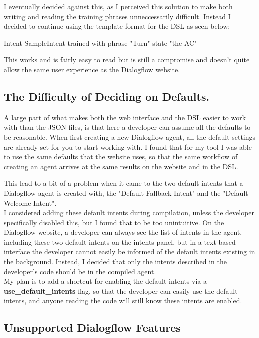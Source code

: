 I eventually decided against this, as I perceived this solution to make both writing and reading the training phrases unneccessarily difficult. Instead I decided to continue using the template format for the DSL as seen below:

\begin{DSL}
    Intent SampleIntent
        trained with phrase
            "Turn" state "the AC"
\end{DSL}

This works and is fairly easy to read but is still a compromise and doesn't quite allow the same user experience as the Dialogflow website.

\subsection{The Difficulty of Deciding on Defaults.}

A large part of what makes both the web interface and the DSL easier to work with than the JSON files, is that here a developer can assume all the defaults to be reasonable. When first creating a new Dialogflow agent, all the default settings are already set for you to start working with. I found that for my tool I was able to use the same defaults that the website uses, so that the same workflow of creating an agent arrives at the same results on the website and in the DSL.

This lead to a bit of a problem when it came to the two default intents that a Dialogflow agent is created with, the "Default Fallback Intent" and the "Default Welcome Intent". \\
I considered adding these default intents during compilation, unless the developer specifically disabled this, but I found that to be too unintuitive. On the Dialogflow website, a developer can always see the list of intents in the agent, including these two default intents on the intents panel, but in a text based interface the developer cannot easily be informed of the default intents existing in the background. Instead, I decided that only the intents described in the developer's code should be in the compiled agent. \\
My plan is to add a shortcut for enabling the default intents via a \textbf{use\_default\_intents} flag, so that the developer can easily use the default intents, and anyone reading the code will still know these intents are enabled.

\subsection{Unsupported Dialogflow Features}

